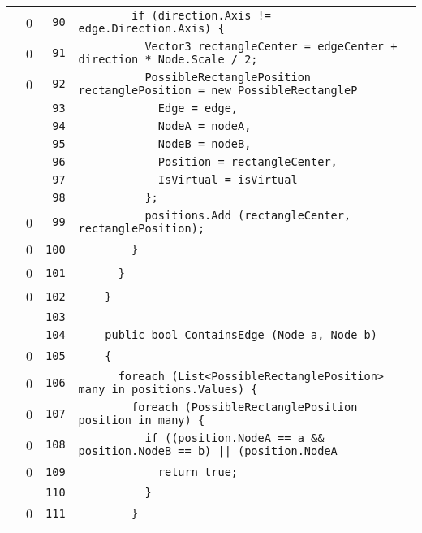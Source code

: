 \documentclass[a4paper,10pt]{article}
\begin{document}
\begin{longtable}[l]{lrrl}
\cellcolor{red} & 0 & \verb~90~ & \verb~        if (direction.Axis != edge.Direction.Axis) {~\\
\cellcolor{red} & 0 & \verb~91~ & \verb~          Vector3 rectangleCenter = edgeCenter + direction * Node.Scale / 2;~\\
\cellcolor{red} & 0 & \verb~92~ & \verb~          PossibleRectanglePosition rectanglePosition = new PossibleRectangleP~\\
\cellcolor{gray} &  & \verb~93~ & \verb~            Edge = edge,~\\
\cellcolor{gray} &  & \verb~94~ & \verb~            NodeA = nodeA,~\\
\cellcolor{gray} &  & \verb~95~ & \verb~            NodeB = nodeB,~\\
\cellcolor{gray} &  & \verb~96~ & \verb~            Position = rectangleCenter,~\\
\cellcolor{gray} &  & \verb~97~ & \verb~            IsVirtual = isVirtual~\\
\cellcolor{gray} &  & \verb~98~ & \verb~          };~\\
\cellcolor{red} & 0 & \verb~99~ & \verb~          positions.Add (rectangleCenter, rectanglePosition);~\\
\cellcolor{red} & 0 & \verb~100~ & \verb~        }~\\
\cellcolor{red} & 0 & \verb~101~ & \verb~      }~\\
\cellcolor{red} & 0 & \verb~102~ & \verb~    }~\\
\cellcolor{gray} &  & \verb~103~ & \verb~~\\
\cellcolor{gray} &  & \verb~104~ & \verb~    public bool ContainsEdge (Node a, Node b)~\\
\cellcolor{red} & 0 & \verb~105~ & \verb~    {~\\
\cellcolor{red} & 0 & \verb~106~ & \verb~      foreach (List<PossibleRectanglePosition> many in positions.Values) {~\\
\cellcolor{red} & 0 & \verb~107~ & \verb~        foreach (PossibleRectanglePosition position in many) {~\\
\cellcolor{red} & 0 & \verb~108~ & \verb~          if ((position.NodeA == a && position.NodeB == b) || (position.NodeA ~\\
\cellcolor{red} & 0 & \verb~109~ & \verb~            return true;~\\
\cellcolor{gray} &  & \verb~110~ & \verb~          }~\\
\cellcolor{red} & 0 & \verb~111~ & \verb~        }~\\

\end{longtable}
\end{document}

